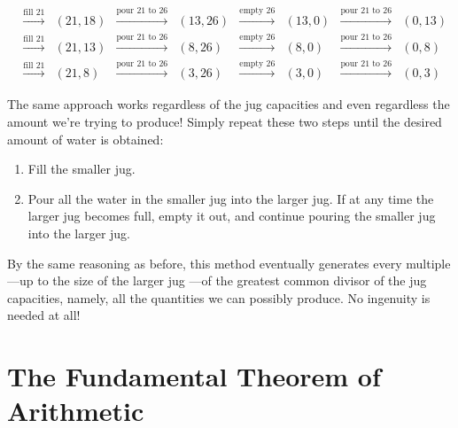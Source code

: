 \[\begin{array}{ccccccccc}
& \xrightarrow{\text{fill 21}} & (21,18)& \xrightarrow{\text{pour 21 to 26}} & (13,26)& \xrightarrow{\text{empty 26}} & (13,0)& \xrightarrow{\text{pour 21 to 26}} & (0,13)\\
& \xrightarrow{\text{fill 21}} & (21,13)& \xrightarrow{\text{pour 21 to 26}} & (8,26)& \xrightarrow{\text{empty 26}} & (8,0)& \xrightarrow{\text{pour 21 to 26}} & (0,8)\\
& \xrightarrow{\text{fill 21}} & (21,8)& \xrightarrow{\text{pour 21 to 26}} & (3,26)& \xrightarrow{\text{empty 26}} & (3,0)& \xrightarrow{\text{pour 21 to 26}} & (0,3)
\end{array}
\]

The same approach works regardless of the jug capacities and even
regardless the amount we're trying to produce!  Simply repeat these
two steps until the desired amount of water is obtained:
\begin{enumerate}
\item Fill the smaller jug.

\item Pour all the water in the smaller jug into the larger jug.
If at any time the larger jug becomes full, empty it out, and continue
pouring the smaller jug into the larger jug.
\end{enumerate}
By the same reasoning as before, this method eventually generates
every multiple ---up to the size of the larger jug ---of the greatest
common divisor of the jug capacities, namely, all the quantities we
can possibly produce.  No ingenuity is needed at all!


\begin{problems}

\practiceproblems
{}

\classproblems
{}

\homeworkproblems
{}

\end{problems}


\section{The Fundamental Theorem of Arithmetic}\label{fundamental_theorem_sec}

